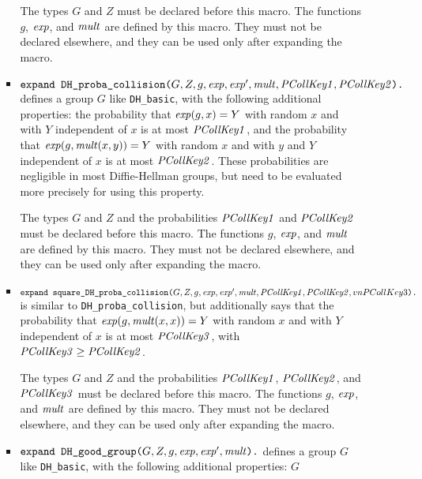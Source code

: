 \documentclass{article}
\begin{document}
\begin{itemize}
\begin{itemize}
\begin{itemize}
       The types $G$ and $Z$ must be declared before this macro.  The
       functions $g$, $\mathit{exp}$, and $\mathit{mult}$ are defined by this
       macro. They must not be declared elsewhere, and they can be used
       only after expanding the macro.

     \item $\texttt{expand\ DH\_proba\_collision(}G, Z, g, \vn{exp},
       \vn{exp}', \vn{mult}, \vn{PCollKey1},
       \vn{PCollKey2}\texttt{).}$ defines a group $G$ like
       \texttt{DH\_basic}, with the following additional properties:
       the probability that $\mathit{exp}(g, x) = Y$ with random $x$ and
       with $Y$ independent of $x$ is at most $\mathit{PCollKey1}$, and
       the probability that $\mathit{exp}(g, \mathit{mult}(x,y)) = Y$ with
       random $x$ and with $y$ and $Y$ independent of $x$ is at most
       $\mathit{PCollKey2}$. These probabilities are negligible in most
       Diffie-Hellman groups, but need to be evaluated more precisely
       for using this property.
       
       The types $G$ and $Z$ and the probabilities $\mathit{PCollKey1}$
       and $\mathit{PCollKey2}$ must be declared before this macro.  The
       functions $g$, $\mathit{exp}$, and $\mathit{mult}$ are defined by this
       macro. They must not be declared elsewhere, and they can be
       used only after expanding the macro.

     \item $\texttt{expand\ square\_DH\_proba\_collision(}G, Z, g, \vn{exp},
       \vn{exp}', \vn{mult}, \vn{PCollKey1},
       \vn{PCollKey2}, vn{PCollKey3}\texttt{).}$ is similar to \texttt{DH\_proba\_collision}, but additionally
   says that the probability that $\mathit{exp}(g, \mathit{mult}(x,x)) = Y$ with
   random $x$ and with $Y$ independent of $x$ is at most $\mathit{PCollKey3}$, with $\mathit{PCollKey3} \geq \mathit{PCollKey2}$.
       
       The types $G$ and $Z$ and the probabilities $\mathit{PCollKey1}$, $\mathit{PCollKey2}$, 
       and $\mathit{PCollKey3}$ must be declared before this macro.  The
       functions $g$, $\mathit{exp}$, and $\mathit{mult}$ are defined by this
       macro. They must not be declared elsewhere, and they can be
       used only after expanding the macro.

     \item $\texttt{expand\ DH\_good\_group(}G, Z, g, \mathit{exp}, \mathit{exp}', \mathit{mult}\texttt{).}$ defines a group $G$ like
       \texttt{DH\_basic}, with the following additional properties:
       $G$ 
       

\end{itemize}
\end{itemize}
\end{itemize}
\end{document}
